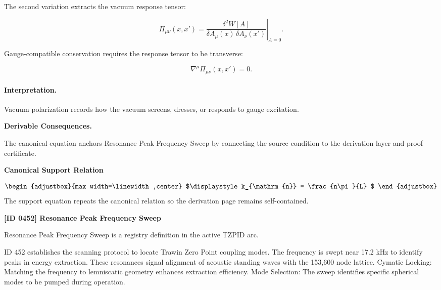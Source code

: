 The second variation extracts the vacuum response tensor:

\begin{equation}
\Pi_{\mu\nu}(x,x')
=
\left.
\frac{\delta^2 W[A]}
{\delta A_\mu(x)\,\delta A_\nu(x')}
\right|_{A=0}.
\end{equation}

Gauge-compatible conservation requires the response tensor to be transverse:

\begin{equation}
\nabla^\mu \Pi_{\mu\nu}(x,x')=0 .
\end{equation}

\paragraph{Interpretation.}
Vacuum polarization records how the vacuum screens, dresses, or responds to gauge excitation.

\par\vspace{0.35em}
\noindent\textbf{Derivable Consequences.}\quad
\begingroup
\footnotesize
\raggedright
The canonical equation anchors Resonance Peak Frequency Sweep by connecting the source condition to the derivation layer and proof certificate.
\par\endgroup

\noindent\textbf{Canonical Support Relation}\par
\[
\begin{adjustbox}{max width=\linewidth,center}
$\displaystyle
k_{\mathrm{n}} = \frac{n\pi}{L}
$
\end{adjustbox}
\]
\noindent The support equation repeats the canonical relation so the derivation page remains self-contained.\par

\clearpage
\noindent\textbf{[ID 0452] Resonance Peak Frequency Sweep}\par
\vspace{0.35em}
\begingroup\small
{}
Resonance Peak Frequency Sweep is a registry definition in the active TZPID arc.

ID 452 establishes the scanning protocol to locate Trawin Zero Point coupling modes. The frequency is swept near 17.2 kHz to identify peaks in energy extraction. These resonances signal alignment of acoustic standing waves with the 153,600 node lattice. Cymatic Locking: Matching the frequency to lemniscatic geometry enhances extraction efficiency. Mode Selection: The sweep identifies specific spherical modes to be pumped during operation.


